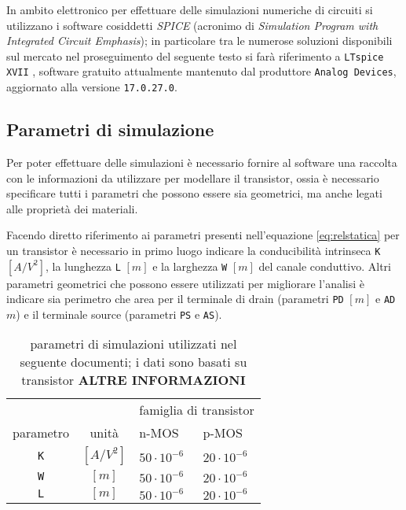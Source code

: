	\vspace{3mm}
	
	In ambito elettronico per effettuare delle simulazioni numeriche di circuiti si utilizzano i software cosiddetti \textit{SPICE} (acronimo di \textit{Simulation Program with Integrated Circuit Emphasis}); in particolare tra le numerose soluzioni disponibili sul mercato nel proseguimento del seguente testo si farà riferimento a \texttt{LTspice XVII} \cite{ltspice}, software gratuito attualmente mantenuto dal produttore \texttt{Analog Devices}, aggiornato alla versione \texttt{17.0.27.0}.
	
\subsection{Parametri di simulazione}
	Per poter effettuare delle simulazioni è necessario fornire al software una raccolta con le informazioni da utilizzare per modellare il transistor, ossia è necessario specificare tutti i parametri che possono essere sia geometrici, ma anche legati alle proprietà dei materiali. 
	
	Facendo diretto riferimento ai parametri presenti nell'equazione \ref{eq:relstatica} per un transistor è necessario in primo luogo indicare la conducibilità intrinseca \texttt{K} $[A/V^2]$, la lunghezza \texttt{L} $[m]$  e la larghezza \texttt{W} $[m]$  del canale conduttivo. Altri parametri geometrici che possono essere utilizzati per migliorare l'analisi è indicare sia perimetro che area per il terminale di drain (parametri \texttt{PD} $[m]$ e \texttt{AD} $m$) e il terminale source (parametri \texttt{PS} e \texttt{AS}).
	
	
	\begin{table}[p]
		
		\centering
		\begin{tabular}{ c c | p{2cm}  p{2cm}}
			& & \multicolumn{2}{c}{famiglia di transistor }  \\
			parametro & unità & n-MOS & p-MOS \\ \hline 
			\texttt{K} & $[A/V^2]$ & $50\cdot 10^{-6}$ & $20\cdot 10^{-6}$ \\
			\texttt{W} & $[m]$ & $50\cdot 10^{-6}$ & $20\cdot 10^{-6}$ \\
			\texttt{L} & $[m]$ & $50\cdot 10^{-6}$ & $20\cdot 10^{-6}$ \\
		\end{tabular}
		\caption{parametri di simulazioni utilizzati nel seguente documenti; i dati sono basati su transistor \textbf{ALTRE INFORMAZIONI}}
		
	\end{table}